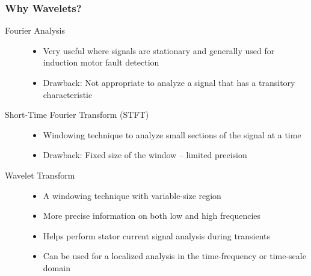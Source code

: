 \documentclass[10pt]{beamer}
\begin{document}
\begin{frame}
\frametitle{Why Wavelets?}
\begin{description}
	\item[Fourier Analysis]
	\begin{itemize}
		\item Very useful where signals are stationary and generally used for induction motor fault detection
		\item Drawback: Not appropriate to analyze a signal that has a transitory characteristic
	\end{itemize}
	\item[Short-Time Fourier Transform (STFT)]
	\begin{itemize}
        	\item Windowing technique to analyze small sections of the signal at a time
		\item Drawback: Fixed size of the window – limited precision
	\end{itemize}
	\item[Wavelet Transform]
	\begin{itemize}
        	\item A windowing technique with variable-size region
          	\item More precise information on both low and high frequencies
          	\item Helps perform stator current signal analysis during transients
          	\item Can be used for a localized analysis in the time-frequency or time-scale domain
	\end{itemize}
\end{description}
\end{frame}
\end{document}
